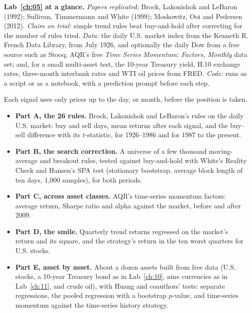 \begin{callout}
\textbf{Lab~\ref{ch:05} at a glance.} \emph{Papers replicated:} Brock, Lakonishok and LeBaron (1992); Sullivan, Timmermann and White (1999); Moskowitz, Ooi and Pedersen (2012). \emph{Claim on trial:} simple trend rules beat buy-and-hold after correcting for the number of rules tried. \emph{Data:} the daily U.S. market index from the Kenneth R. French Data Library, from July 1926, and optionally the daily Dow from a free source such as Stooq; AQR's free \emph{Time Series Momentum: Factors, Monthly} data set; and, for a small multi-asset test, the 10-year Treasury yield, H.10 exchange rates, three-month interbank rates and WTI oil prices from FRED. \emph{Code:} runs as a script or as a notebook, with a prediction prompt before each step.
\end{callout}

Each signal uses only prices up to the day, or month, before the position is taken.

\begin{itemize}
  \item \textbf{Part A, the 26 rules.} Brock, Lakonishok and LeBaron's rules on the daily U.S. market: buy and sell days, mean returns after each signal, and the buy--sell difference with its $t$-statistic, for 1926--1986 and for 1987 to the present.
  \item \textbf{Part B, the search correction.} A universe of a few thousand moving-average and breakout rules, tested against buy-and-hold with White's Reality Check and Hansen's SPA test (stationary bootstrap, average block length of ten days, 1,000 samples), for both periods.
  \item \textbf{Part C, across asset classes.} AQR's time-series momentum factors: average return, Sharpe ratio and alpha against the market, before and after 2009.
  \item \textbf{Part D, the smile.} Quarterly trend returns regressed on the market's return and its square, and the strategy's return in the ten worst quarters for U.S. stocks.
  \item \textbf{Part E, asset by asset.} About a dozen assets built from free data (U.S. stocks, a 10-year Treasury bond as in Lab~\ref{ch:10}, nine currencies as in Lab~\ref{ch:11}, and crude oil), with Huang and coauthors' tests: separate regressions, the pooled regression with a bootstrap $p$-value, and time-series momentum against the time-series history strategy.
\end{itemize}

